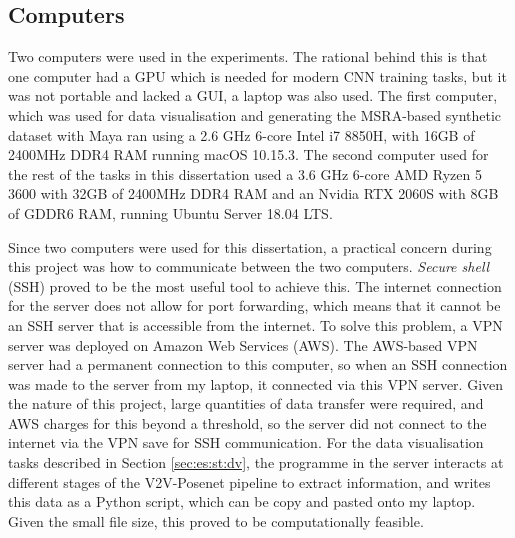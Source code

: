 \subsection{Computers}
Two computers were used in the experiments. The rational behind this is that one computer had a GPU which is needed for modern CNN training tasks, but it was not portable and lacked a GUI, a laptop was also used. The first computer, which was used for data visualisation and generating the MSRA-based synthetic dataset with Maya ran using a 2.6 GHz 6-core Intel i7 8850H, with 16GB of 2400MHz DDR4 RAM running macOS 10.15.3. The second computer used for the rest of the tasks in this dissertation used a 3.6 GHz 6-core AMD Ryzen 5 3600 with 32GB of 2400MHz DDR4 RAM and an Nvidia RTX 2060S with 8GB of GDDR6 RAM, running Ubuntu Server 18.04 LTS.

Since two computers were used for this dissertation, a practical concern during this project was how to communicate between the two computers. {\slshape Secure shell} (SSH) proved to be the most useful tool to achieve this. The internet connection for the server does not allow for port forwarding, which means that it cannot be an SSH server that is accessible from the internet. To solve this problem, a VPN server was deployed on Amazon Web Services (AWS). The AWS-based VPN server had a permanent connection to this computer, so when an SSH connection was made to the server from my laptop, it connected via this VPN server. Given the nature of this project, large quantities of data transfer were required, and AWS charges for this beyond a threshold, so the server did not connect to the internet via the VPN save for SSH communication. For the data visualisation tasks described in Section \ref{sec:es:st:dv}, the programme in the server interacts at different stages of the V2V-Posenet pipeline to extract information, and writes this data as a Python script, which can be copy and pasted onto my laptop. Given the small file size, this proved to be computationally feasible. 
